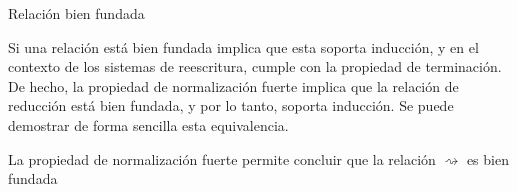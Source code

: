 \begin{codigo}
	Relación bien fundada
\end{codigo}

Si una relación está bien fundada implica que esta soporta inducción, y en el contexto de los sistemas de reescritura, cumple con la propiedad de terminación.
De hecho, la propiedad de normalización fuerte implica que la relación de reducción está bien fundada, y por lo tanto, soporta inducción.
Se puede demostrar de forma sencilla esta equivalencia.

\begin{codigo}
	La propiedad de normalización fuerte permite concluir que la relación $\rightsquigarrow$ es bien fundada
\end{codigo} 
